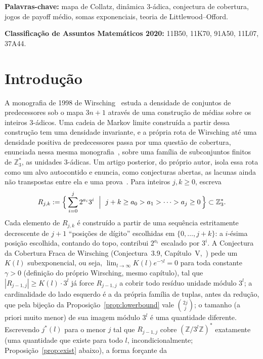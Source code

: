 \documentclass[11pt]{amsart}
\theoremstyle{plain}
\theoremstyle{definition}
\theoremstyle{remark}
\newcommand{\Z}{\mathbb{Z}}
\begin{document}
\noindent\textbf{Palavras-chave:} mapa de Collatz, dinâmica $3$-ádica, conjectura de cobertura,
jogos de payoff médio, somas exponenciais, teoria de Littlewood--Offord.

\noindent\textbf{Classificação de Assuntos Matemáticos 2020:} 11B50, 11K70, 91A50, 11L07, 37A44.

\section{Introdução}
\label{sec:intro}

A monografia de 1998 de Wirsching~\cite{wirsching1998} estuda a densidade de conjuntos de
predecessores sob o mapa $3n+1$ através de uma construção de médias sobre os inteiros $3$-ádicos.
Uma cadeia de Markov limite construída a partir dessa construção tem uma densidade invariante, e a
própria rota de Wirsching até uma densidade positiva de predecessores passa por uma questão de
cobertura, enunciada nessa mesma monografia~\cite{wirsching1998}, sobre uma família de subconjuntos
finitos de $\Z_3^*$, as unidades $3$-ádicas. Um artigo posterior, do próprio autor, isola essa rota
como um alvo autocontido e enuncia, como conjecturas abertas, as lacunas ainda não transpostas entre
ela e uma prova~\cite{wirsching2003}. Para inteiros $j,k\ge0$, escreva
\begin{equation}
\label{eq:Rjk}
R_{j,k} := \Bigl\{\, \sum_{i=0}^{j} 2^{a_i}3^i \ \Bigm|\ j+k \ge a_0 > a_1 > \cdots > a_j \ge 0
\,\Bigr\} \subset \Z_3^*.
\end{equation}
Cada elemento de $R_{j,k}$ é construído a partir de uma sequência estritamente decrescente de $j+1$
``posições de dígito'' escolhidas em $\{0,\dots,j+k\}$: a $i$-ésima posição escolhida, contando do
topo, contribui $2^{a_i}$ escalado por $3^i$. A Conjectura da Cobertura Fraca de Wirsching
(Conjectura~3.9, Capítulo~V,~\cite{wirsching1998}) pede um $K(l)$ subexponencial, ou seja,
$\lim_{l\to\infty} K(l)e^{-\gamma l}=0$ para toda constante $\gamma>0$ (definição do próprio
Wirsching, mesmo capítulo), tal que $|R_{j-1,j}| \ge K(l)\cdot 3^l$ já force $R_{j-1,j}$ a cobrir
todo resíduo unidade módulo $3^l$; a cardinalidade do lado esquerdo é a da própria família de
tuplas, antes da redução, que pela bijeção da Proposição~\ref{prop:lowerbound} vale $\binom{2j}{j}$;
o tamanho (a priori muito menor) de sua imagem módulo $3^l$ é uma quantidade diferente. Escrevendo
$j^*(l)$ para o menor $j$ tal que $R_{j-1,j}$ cobre $(\Z/3^l\Z)^*$ exatamente (uma quantidade que
existe para todo $l$, incondicionalmente; Proposição~\ref{prop:exist} abaixo), a forma forçante da
\end{document}
